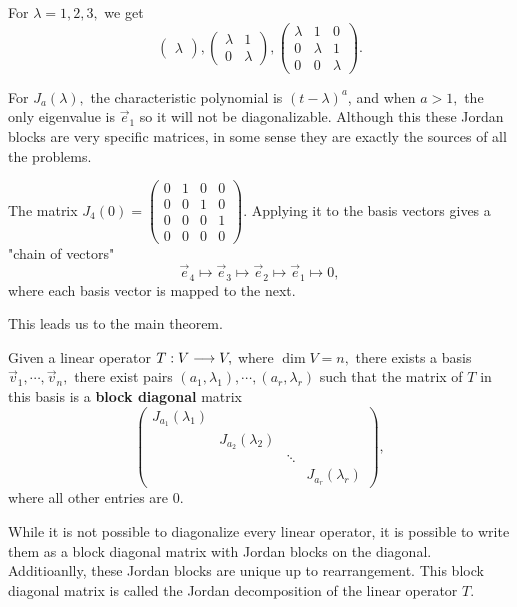 \begin{example}
For $\lambda = 1, 2, 3,$ we get 
\[
\begin{pmatrix}
\lambda
\end{pmatrix}, \begin{pmatrix} \lambda & 1 \\ 0 & \lambda \end{pmatrix}, \begin{pmatrix}
\lambda & 1 & 0 \\
0 & \lambda & 1 \\
0 & 0 & \lambda
\end{pmatrix}.
\]
\end{example}

For $J_a(\lambda),$ the characteristic polynomial is $(t-\lambda)^a$, and when $a > 1,$ the only eigenvalue is $\vec{e}_1$ so it will not be diagonalizable. Although this these Jordan blocks are very specific matrices, in some sense they are exactly the sources of all the problems.

\begin{example}[$J_4(0)$]
The matrix $J_4(0) = \begin{pmatrix}
0 & 1 & 0 & 0 \\
0 & 0 & 1 & 0 \\
0 & 0 & 0 & 1 \\
0 & 0 & 0 & 0
\end{pmatrix}$. Applying it to the basis vectors gives a "chain of vectors"
\[
\vec{e}_4 \mapsto \vec{e}_3 \mapsto \vec{e}_2 \mapsto \vec{e}_1 \mapsto 0,
\]
where each basis vector is mapped to the next.
\end{example}
This leads us to the main theorem.

\begin{theorem}
Given a linear operator $T: V \longrightarrow V,$ where $\dim V = n,$ there exists a basis $\vec{v}_1, \cdots, \vec{v}_n,$ there exist pairs $(a_1, \lambda_1), \cdots, (a_r, \lambda_r)$ such that the matrix of $T$ in this basis is a \textbf{block diagonal} matrix
\[\begin{pmatrix}
J_{a_1}(\lambda_1) &  & & \\
 & J_{a_2}(\lambda_2) &  & \\
 &  & \ddots  & \\
 & & & J_{a_r}(\lambda_r)
\end{pmatrix},\]
where all other entries are 0.
\end{theorem}

While it is not possible to diagonalize every linear operator, it is possible to write them as a block diagonal matrix with Jordan blocks on the diagonal. Additioanlly, these Jordan blocks are unique up to rearrangement. This block diagonal matrix is called the Jordan decomposition of the linear operator $T.$

